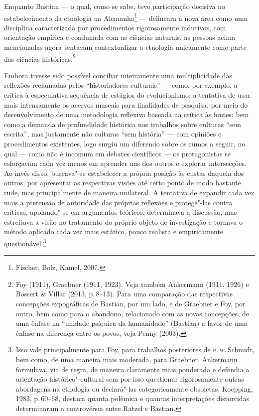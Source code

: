 Enquanto Bastian --- o qual, como se sabe, teve participação decisiva no
estabelecimento da etnologia na Alemanha\footnote{Fischer, Bolz, Kamel, 2007.} ---
delineara a nova área como uma disciplina caracterizada por
procedimentos rigorosamente indutivos, com orientação empírica e
coadunada com as ciências naturais, as pessoas acima mencionadas agora
tentavam contextualizar a etnologia unicamente como parte das
ciências históricas.\footnote{Foy (1911), Graebner (1911, 1923). Veja
  também Ankermann (1911, 1926) e Bossert \& Villar (2013, p.\,8--13). Para uma comparação das respectivas concepções expográficas de
  Bastian, por um lado, e de Graebner e Foy, por outro, bem como para o
  abandono, relacionado com as novas concepções, de uma ênfase na
  ``unidade psíquica da humanidade'' (Bastian) a favor de uma ênfase na
  diferença entre os povos, veja Penny (2003).}

Embora tivesse sido possível conciliar inteiramente uma multiplicidade
das reflexões reclamadas pelos ``historiadores culturais'' --- como, por
exemplo, a crítica à especulativa sequência de estágios do
evolucionismo; a tentativa de usar mais intensamente os acervos museais
para finalidades de pesquisa, por meio do desenvolvimento de uma
metodologia reflexiva baseada na crítica às fontes; bem como a demanda
de profundidade histórica nos trabalhos sobre culturas ``sem escrita'',
mas justamente não culturas ``sem história'' --- com opiniões e
procedimentos existentes, logo surgiu um diferendo sobre os rumos a
seguir, no qual --- como não é incomum em debates científicos --- os
protagonistas se esforçavam cada vez menos em aprender uns dos outros e
explorar intersecções. Ao invés disso, buscava"-se estabelecer a própria
posição às custas daquela dos outros, por apresentar as respectivas
visões até certo ponto de modo bastante rude, mas principalmente de
maneira unilateral. A tentativa de expandir cada vez mais a pretensão
de autoridade das próprias reflexões e protegê"-las contra críticas,
apoiando"-se em argumentos teóricos, determinava a discussão, mas
estreitava a visão no tratamento do próprio objeto de investigação e
tornava o método aplicado cada vez mais estático, pouco realista e
empiricamente questionável.\footnote{Isso vale principalmente para Foy,
  para trabalhos posteriores de \textsc{p}.\,\textsc{w}.\,Schmidt, bem como, de uma maneira
  mais moderada, para Graebner. Ankermann formulava, via de regra, de
  maneira claramente mais ponderada e defendia a orientação
  histórico"-cultural sem por isso questionar rigorosamente outras
  abordagens na etnologia ou declará"-las categoricamente obsoletas.
  Koepping, 1983, p.\,60--68, destaca quanta polêmica e quantas
  interpretações distorcidas determinaram a controvérsia entre Ratzel e
  Bastian.}

